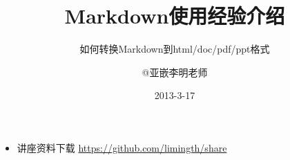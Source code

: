 \documentclass[10pt]{beamer}
\title{Markdown使用经验介绍}
\subtitle{如何转换Markdown到html/doc/pdf/ppt格式}
\author{@亚嵌李明老师}
\date{2013-3-17}
\institute{http://weibo.com/limingth}
\begin{document}
\begin{frame}
\titlepage
\begin{itemize}
\item 	讲座资料下载 \url{https://github.com/limingth/share}
\end{itemize}
\end{frame}


\end{document}
